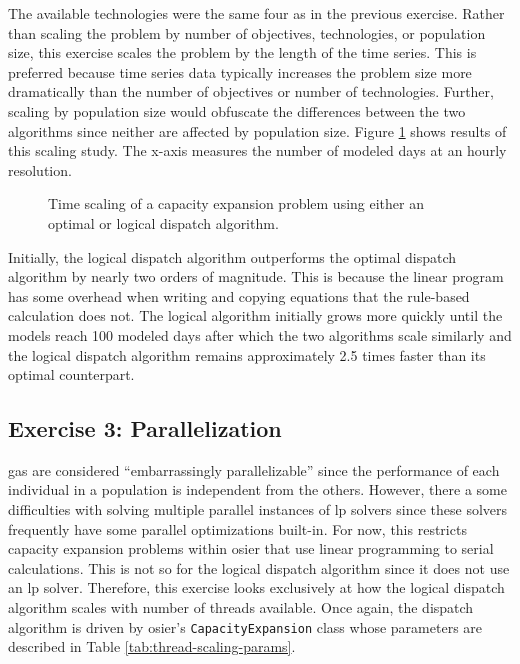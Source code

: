 \noindent The available technologies were the same four as in the previous
exercise. Rather than scaling the problem by number of objectives, technologies,
or population size, this exercise scales the problem by the length of the time
series. This is preferred because time series data typically increases the
problem size more dramatically than the number of objectives or number of
technologies. Further, scaling by population size would obfuscate the
differences between the two algorithms since neither are affected by population
size. Figure \ref{fig:alg-scaling} shows results of this scaling study. The
x-axis measures the number of modeled days at an hourly resolution.

\begin{figure}[htbp!]
    \centering
    \resizebox{0.75\columnwidth}{!}{}
    \caption{Time scaling of a capacity expansion problem using either an optimal or logical dispatch algorithm.}
    \label{fig:alg-scaling}
\end{figure}

\noindent Initially, the logical dispatch algorithm outperforms the optimal
dispatch algorithm by nearly two orders of magnitude. This is because the linear
program has some overhead when writing and copying equations that the rule-based
calculation does not. The logical algorithm initially grows more quickly until
the models reach 100 modeled days after which the two algorithms scale
similarly and the logical dispatch algorithm remains approximately 2.5 times
faster than its optimal counterpart.

\subsection{Exercise 3: Parallelization}

\Acp{ga} are considered ``embarrassingly parallelizable'' since the performance
of each individual in a population is independent from the others. However, there
a some difficulties with solving multiple parallel instances of \ac{lp} solvers
since these solvers frequently have some parallel optimizations built-in. For
now, this restricts capacity expansion problems within \ac{osier} that use linear 
programming to serial calculations. This is not so for the logical dispatch algorithm 
since it does
not use an \ac{lp} solver. Therefore, this exercise looks exclusively at how the
logical dispatch algorithm scales with number of threads available. Once again,
the dispatch algorithm is driven by \ac{osier}'s \texttt{CapacityExpansion}
class whose parameters are described in Table \ref{tab:thread-scaling-params}. 

